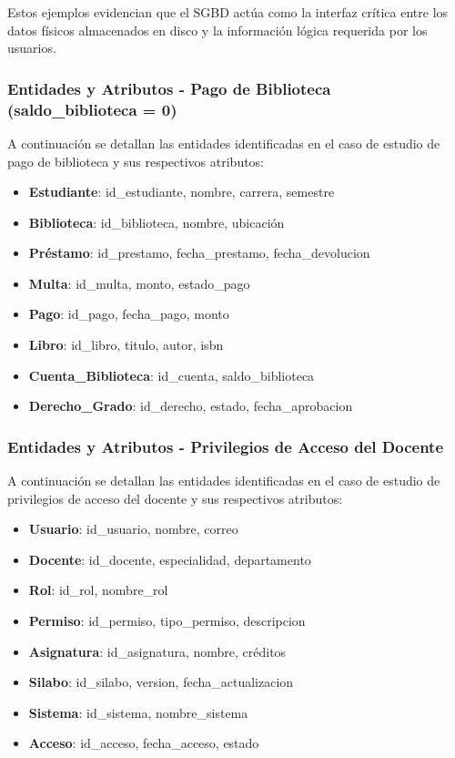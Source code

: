 \documentclass{article}
\begin{document}
Estos ejemplos evidencian que el SGBD actúa como la interfaz crítica entre los datos físicos almacenados en disco y la información lógica requerida por los usuarios.

\subsubsection{Entidades y Atributos - Pago de Biblioteca (saldo\_biblioteca = 0)}

A continuación se detallan las entidades identificadas en el caso de estudio de pago de biblioteca y sus respectivos atributos:

\begin{itemize}
    \item \textbf{Estudiante}: id\_estudiante, nombre, carrera, semestre
    \item \textbf{Biblioteca}: id\_biblioteca, nombre, ubicación
    \item \textbf{Préstamo}: id\_prestamo, fecha\_prestamo, fecha\_devolucion
    \item \textbf{Multa}: id\_multa, monto, estado\_pago
    \item \textbf{Pago}: id\_pago, fecha\_pago, monto
    \item \textbf{Libro}: id\_libro, titulo, autor, isbn
    \item \textbf{Cuenta\_Biblioteca}: id\_cuenta, saldo\_biblioteca
    \item \textbf{Derecho\_Grado}: id\_derecho, estado, fecha\_aprobacion
\end{itemize}

\subsubsection{Entidades y Atributos - Privilegios de Acceso del Docente}

A continuación se detallan las entidades identificadas en el caso de estudio de privilegios de acceso del docente y sus respectivos atributos:

\begin{itemize}
    \item \textbf{Usuario}: id\_usuario, nombre, correo
    \item \textbf{Docente}: id\_docente, especialidad, departamento
    \item \textbf{Rol}: id\_rol, nombre\_rol
    \item \textbf{Permiso}: id\_permiso, tipo\_permiso, descripcion
    \item \textbf{Asignatura}: id\_asignatura, nombre, créditos
    \item \textbf{Silabo}: id\_silabo, version, fecha\_actualizacion
    \item \textbf{Sistema}: id\_sistema, nombre\_sistema
    \item \textbf{Acceso}: id\_acceso, fecha\_acceso, estado
\end{itemize}
\end{document}

